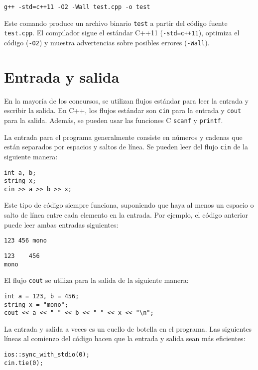 \begin{lstlisting}
g++ -std=c++11 -O2 -Wall test.cpp -o test
\end{lstlisting}

Este comando produce un archivo binario \texttt{test}
a partir del código fuente \texttt{test.cpp}.
El compilador sigue el estándar C++11
(\texttt{-std=c++11}),
optimiza el código (\texttt{-O2})
y muestra advertencias sobre posibles errores (\texttt{-Wall}).

\section{Entrada y salida}


En la mayoría de los concursos, se utilizan flujos estándar
para leer la entrada y escribir la salida.
En C++, los flujos estándar son
\texttt{cin} para la entrada y \texttt{cout} para la salida.
Además, se pueden usar las funciones C
\texttt{scanf} y \texttt{printf}.

La entrada para el programa generalmente consiste en
números y cadenas que están separados por
espacios y saltos de línea.
Se pueden leer del flujo \texttt{cin}
de la siguiente manera:

\begin{lstlisting}
int a, b;
string x;
cin >> a >> b >> x;
\end{lstlisting}

Este tipo de código siempre funciona,
suponiendo que haya al menos un espacio
o salto de línea entre cada elemento en la entrada.
Por ejemplo, el código anterior puede leer
ambas entradas siguientes:
\begin{lstlisting}
123 456 mono
\end{lstlisting}
\begin{lstlisting}
123    456
mono
\end{lstlisting}
El flujo \texttt{cout} se utiliza para la salida
de la siguiente manera:
\begin{lstlisting}
int a = 123, b = 456;
string x = "mono";
cout << a << " " << b << " " << x << "\n";
\end{lstlisting}

La entrada y salida a veces
es un cuello de botella en el programa.
Las siguientes líneas al comienzo del código
hacen que la entrada y salida sean más eficientes:

\begin{lstlisting}
ios::sync_with_stdio(0);
cin.tie(0);
\end{lstlisting}

